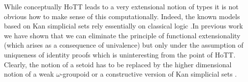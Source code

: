 \documentclass[twocolumn,a4paper,11pt]{article}
\begin{document}
While conceptually HoTT leads to a very extensional notion of types it
is not obvious how to make sense of this computationally. Indeed, the
known models based on Kan simplicial sets rely essentially on
classical logic \cite{coqHuber:conKan}.In previous
work \cite{alti:lics01,alti:ott-conf} we have shown that we can
eliminate the principle of functional extensionality (which arises as
a consequence of univalence) but only under the assumption of
uniqueness of identity proofs which is uninteresting from the point of
HoTT. Clearly, the notion of a setoid has to be replaced by the higher
dimensional notion of a weak $\omega$-groupoid
\cite{altenRypacek:weakOmegaGrp,brunerie13} or a constructive version of Kan
simplicial sets \cite{coqHuber:conKan}.

\end{document}
